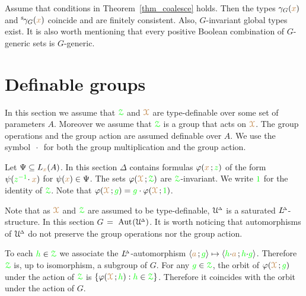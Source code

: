 
\begin{remark}\label{rem_coalesce} 
  Assume that conditions  in Theorem~\ref{thm_coalesce} holds.
  Then the types $\gamma_G({\color{brown} x})$ and ${}^{\rm s}\kern-.2ex\gamma_G({\color{brown} x})$ coincide and are finitely consistent.
  Also, $G$-invariant global types exist.
  It is also worth mentioning that every positive Boolean combination of $G$-generic sets is $G$-generic.
\end{remark}

\section{Definable groups}\label{definablegroups}

\def\medrel#1{\parbox[t]{5ex}{$\displaystyle\hfil #1$}}
\def\ceq#1#2#3{\parbox[t]{25ex}{$\displaystyle #1$}\medrel{#2}{$\displaystyle #3$}}

In this section we assume that ${\color{green}\EuScript Z}$ and ${\color{brown}\EuScript X}$ are type-definable over some set of parameters $A$.
Moreover we assume that ${\color{green}\EuScript Z}$ is a group that acts on ${\color{brown}\EuScript X}$.
The group operations and the group action are assumed definable over $A$.
We use the symbol $\,\cdot\,$ for both the group multiplication and the group action.

Let $\Psi\subseteq L_{\color{brown} x}(A)$.
In this section $\Delta$ contains formulas $\varphi({\color{brown} x}\,;{\color{green} z})$ of the form  $\psi({\color{green} z^{-1}}\!\cdot{\color{brown}x})$ for $\psi({\color{brown} x})\in\Psi$.
The sets $\varphi({\color{brown}\EuScript X}\,;{\color{green}\EuScript Z})$ are ${\color{green}\EuScript Z}$-invariant.
We write ${\color{green} 1}$ for the identity of ${\color{green}\EuScript Z}$.
Note that $\varphi({\color{brown}\EuScript X}\,;{\color{green} g})={\color{green} g}\cdot\varphi({\color{brown}\EuScript X}\,;{\color{green} 1})$.

Note that as ${\color{brown}\EuScript X}$ and ${\color{green}\EuScript Z}$ are assumed to be type-definable, $\EuScript U\kern-.2ex^{\scriptscriptstyle\Delta}$ is a saturated $L\kern-.5ex^{\scriptscriptstyle\Delta}$-structure.
In this section \emph{$G$}$~=~{\rm Aut\kern.15ex}(\EuScript U\kern-.2ex^{\scriptscriptstyle\Delta})$.
It is worth noticing that automorphisms of $\EuScript U\kern-.2ex^{\scriptscriptstyle\Delta}$ do not preserve the group operations nor the group action.

To each ${\color{green} h}\in{\color{green}\EuScript Z}$ we associate the $L\kern-.5ex^{\scriptscriptstyle\Delta}$-automorphism $\langle{\color{brown}a}\,;{\color{green} g}\rangle\mapsto\langle{\color{green}h}{\cdot}{\color{brown}a}\,;{\color{green} h}{\cdot}{\color{green} g}\rangle$.
Therefore ${\color{green}\EuScript Z}$ is, up to isomorphism, a subgroup of $G$.
For any ${\color{green} g}\in{\color{green}\EuScript Z}$, the orbit of $\varphi({\color{brown}\EuScript X}\,;{\color{green} g})$ under the action of ${\color{green}\EuScript Z}$ is $\{\varphi({\color{brown}\EuScript X}\,;{\color{green} h}) : {\color{green} h}\in{\color{green}\EuScript Z}\}$.
Therefore it coincides with the orbit under the action of $G$.

